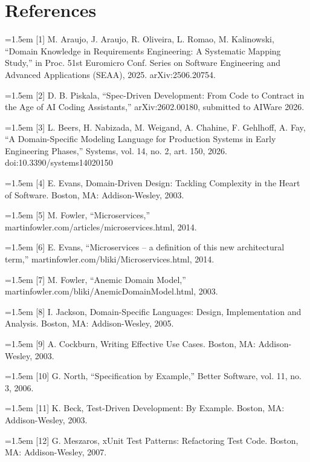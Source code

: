 \documentclass[11pt,a4paper]{article}
\begin{document}
\section*{References}

\noindent\hangindent=1.5em [1] M. Araujo, J. Araujo, R. Oliveira, L. Romao, M. Kalinowski, ``Domain Knowledge in Requirements Engineering: A Systematic Mapping Study,'' in Proc. 51st Euromicro Conf. Series on Software Engineering and Advanced Applications (SEAA), 2025. arXiv:2506.20754.

\noindent\hangindent=1.5em [2] D. B. Piskala, ``Spec-Driven Development: From Code to Contract in the Age of AI Coding Assistants,'' arXiv:2602.00180, submitted to AIWare 2026.

\noindent\hangindent=1.5em [3] L. Beers, H. Nabizada, M. Weigand, A. Chahine, F. Gehlhoff, A. Fay, ``A Domain-Specific Modeling Language for Production Systems in Early Engineering Phases,'' Systems, vol. 14, no. 2, art. 150, 2026. doi:10.3390/systems14020150

\noindent\hangindent=1.5em [4] E. Evans, Domain-Driven Design: Tackling Complexity in the Heart of Software. Boston, MA: Addison-Wesley, 2003.

\noindent\hangindent=1.5em [5] M. Fowler, ``Microservices,'' martinfowler.com/articles/microservices.html, 2014.

\noindent\hangindent=1.5em [6] E. Evans, ``Microservices -- a definition of this new architectural term,'' martinfowler.com/bliki/Microservices.html, 2014.

\noindent\hangindent=1.5em [7] M. Fowler, ``Anemic Domain Model,'' martinfowler.com/bliki/AnemicDomainModel.html, 2003.

\noindent\hangindent=1.5em [8] I. Jackson, Domain-Specific Languages: Design, Implementation and Analysis. Boston, MA: Addison-Wesley, 2005.

\noindent\hangindent=1.5em [9] A. Cockburn, Writing Effective Use Cases. Boston, MA: Addison-Wesley, 2003.

\noindent\hangindent=1.5em [10] G. North, ``Specification by Example,'' Better Software, vol. 11, no. 3, 2006.

\noindent\hangindent=1.5em [11] K. Beck, Test-Driven Development: By Example. Boston, MA: Addison-Wesley, 2003.

\noindent\hangindent=1.5em [12] G. Meszaros, xUnit Test Patterns: Refactoring Test Code. Boston, MA: Addison-Wesley, 2007.
\end{document}
